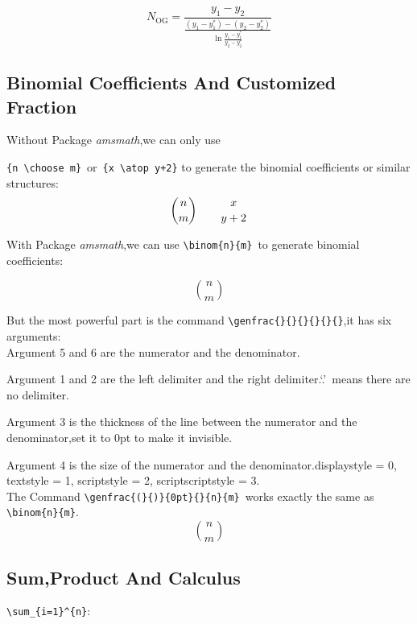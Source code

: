 \documentclass[a4paper]{report}
\begin{document}
\begin{displaymath}
N_{\mathrm{OG}}= \frac
{
    y^{}_1 - y^{}_2
}
{
    \displaystyle\frac
    {
        (y^{}_1 - y^*_1) - (y^{}_2 - y^*_2)
    }
    {
        \ln\frac{y^{}_1 - y^*_1}{y^{}_2 - y^*_2}
    }
}
\end{displaymath}
\subsection{Binomial Coefficients And Customized Fraction}
Without Package \emph{amsmath},we can only use

\verb|{n \choose m}|\ or\ \verb|{x \atop y+2}| to generate the
binomial coefficients or similar structures:
\begin{displaymath}
{n \choose m} \qquad {x \atop y+2}
\end{displaymath}

With Package \emph{amsmath},we can use \verb|\binom{n}{m}|\ to
generate binomial coefficients:

\begin{displaymath}
\binom{n}{m}
\end{displaymath}

But the most powerful part is the command
\verb|\genfrac{}{}{}{}{}{}|,it has six
arguments:\\

Argument 5 and 6 are the numerator and the denominator.

Argument 1 and 2 are the left delimiter and the right delimiter.`.'\
means there are no delimiter.

Argument 3 is the thickness of the line between the numerator and
the denominator,set it to 0pt to make it invisible.

Argument 4 is the size of the numerator and the
denominator.displaystyle = 0, textstyle = 1, scriptstyle = 2,
scriptscriptstyle = 3.\\

The Command \verb|\genfrac{(}{)}{0pt}{}{n}{m}|\ works exactly the
same as \verb|\binom{n}{m}|.
\begin{displaymath}
\genfrac{(}{)}{0pt}{}{n}{m}
\end{displaymath}

\subsection{Sum,Product And Calculus}\label{+*}


\verb|\sum_{i=1}^{n}|:
\end{document}
